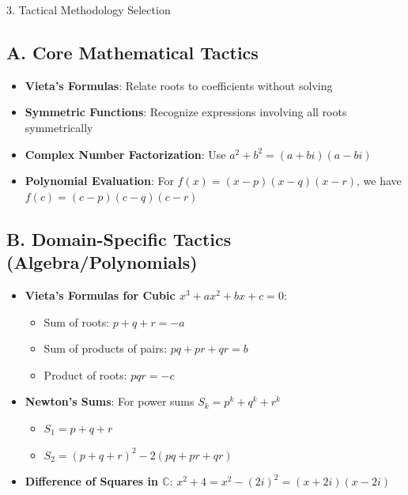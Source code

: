 \documentclass[12pt]{article}
\begin{document}
\begin{tacticsbox}{3. Tactical Methodology Selection}

\subsection*{A. Core Mathematical Tactics}
\begin{itemize}[leftmargin=*]
    \item \textbf{Vieta's Formulas}: Relate roots to coefficients without solving
    
    \item \textbf{Symmetric Functions}: Recognize expressions involving all roots symmetrically
    
    \item \textbf{Complex Number Factorization}: Use $a^2 + b^2 = (a + bi)(a - bi)$
    
    \item \textbf{Polynomial Evaluation}: For $f(x) = (x - p)(x - q)(x - r)$, we have $f(c) = (c - p)(c - q)(c - r)$
\end{itemize}

\subsection*{B. Domain-Specific Tactics (Algebra/Polynomials)}
\begin{itemize}[leftmargin=*]
    \item \textbf{Vieta's Formulas for Cubic $x^3 + ax^2 + bx + c = 0$}:
    \begin{itemize}
        \item Sum of roots: $p + q + r = -a$
        \item Sum of products of pairs: $pq + pr + qr = b$
        \item Product of roots: $pqr = -c$
    \end{itemize}
    
    \item \textbf{Newton's Sums}: For power sums $S_k = p^k + q^k + r^k$
    \begin{itemize}
        \item $S_1 = p + q + r$
        \item $S_2 = (p + q + r)^2 - 2(pq + pr + qr)$
    \end{itemize}
    
    \item \textbf{Difference of Squares in $\mathbb{C}$}: $x^2 + 4 = x^2 - (2i)^2 = (x + 2i)(x - 2i)$
    

\end{itemize}
\end{tacticsbox}
\end{document}
